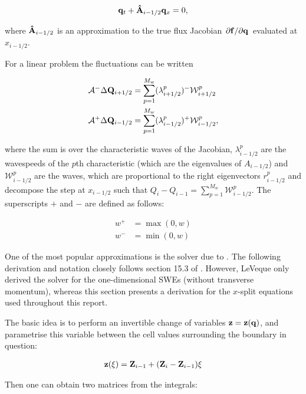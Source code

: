 \begin{align}
  \vb q_t + \vu A_{i-1/2} \vb q_x = 0,
\end{align}

where $\vu A_{i-1/2}$ is an approximation to the true flux Jacobian $\pdv*{\vb f}{\vb q}$ evaluated at $x_{i-1/2}$.

For a linear problem the fluctuations can be written

\begin{subequations}
  \label{eq:approx_fluct}
\begin{align}
  \mathcal{A}^- \Delta \vb Q_{i+1/2} &= \sum_{p=1}^{M_w} (\lambda_{i+1/2}^p)^- \mathcal{W}_{i+1/2}^p \\
  \mathcal{A}^+ \Delta \vb Q_{i-1/2} &= \sum_{p=1}^{M_w} (\lambda_{i-1/2}^p)^+ \mathcal{W}_{i-1/2}^p,
\end{align}
\end{subequations}

where the sum is over the characteristic waves of the Jacobian, $\lambda_{i-1/2}^p$ are the wavespeeds of the $p$th characteristic (which are the eigenvalues of $A_{i-1/2}$) and $\mathcal{W}_{i-1/2}^p$ are the waves, which are proportional to the right eigenvectors $r_{i-1/2}^p$ and decompose the step at $x_{i-1/2}$ such that $Q_i - Q_{i-1} = \sum_{p=1}^{M_w} \mathcal{W}_{i-1/2}^p$. The superscripts $+$ and $-$ are defined as follows:

\begin{align}
  w^+ &= \max(0, w) \\
  w^- &= \min(0, w)
\end{align}

One of the most popular approximations is the solver due to \citet{roe1981approximate}. The following derivation and notation closely follows section 15.3 of \cite{leveque2002finite}. However, LeVeque only derived the solver for the one-dimensional SWEs (without transverse momentum), whereas this section presents a derivation for the $x$-split equations used throughout this report.

The basic idea is to perform an invertible change of variables $\vb z = \vb z(\vb q)$, and parametrise this variable between the cell values surrounding the boundary in question:

\begin{align}
  \vb z(\xi) = \vb Z_{i-1} + (\vb Z_i - \vb Z_{i-1})\xi
\end{align}

Then one can obtain two matrices from the integrals:

